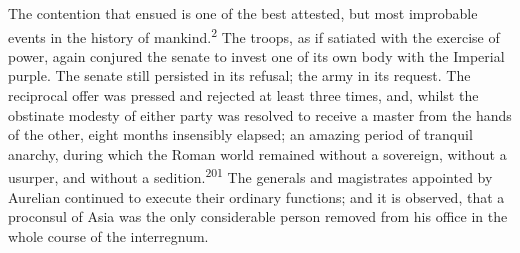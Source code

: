 
The contention that ensued is one of the best attested, but most
improbable events in the history of mankind.\textsuperscript{2} The troops, as if
satiated with the exercise of power, again conjured the senate to
invest one of its own body with the Imperial purple. The senate
still persisted in its refusal; the army in its request. The
reciprocal offer was pressed and rejected at least three times,
and, whilst the obstinate modesty of either party was resolved to
receive a master from the hands of the other, eight months
insensibly elapsed; an amazing period of tranquil anarchy, during
which the Roman world remained without a sovereign, without a
usurper, and without a sedition.\textsuperscript{201} The generals and magistrates
appointed by Aurelian continued to execute their ordinary
functions; and it is observed, that a proconsul of Asia was the
only considerable person removed from his office in the whole
course of the interregnum.



